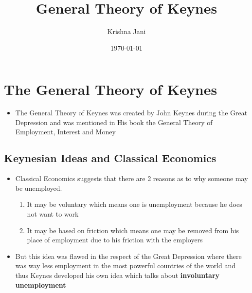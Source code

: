 \documentclass[11pt]{article}
\author{Krishna Jani}
\date{\today}
\title{General Theory of Keynes}
\begin{document}
\maketitle
\tableofcontents


\section{The General Theory of Keynes}
\label{sec:org741cd0a}
\begin{itemize}
\item The General Theory of Keynes was created by John Keynes during the Great Depression and was mentioned in His book the General Theory of Employment, Interest and Money
\end{itemize}

\subsection{Keynesian Ideas and Classical Economics}
\label{sec:orgc5d055d}
\begin{itemize}
\item Classical Economics suggests that there are 2 reasons as to why someone may be unemployed.

\begin{enumerate}
\item It may be voluntary which means one is unemployment because he does not want to work
\item It may be based on friction which means one may be removed from his place of employment due to his friction with the employers
\end{enumerate}

\item But this idea was flawed in the respect of the Great Depression where there was way less employment in the most powerful countries of the world and thus Keynes developed his own idea which talks about \textbf{involuntary unemployment}
\end{itemize}
\end{document}
